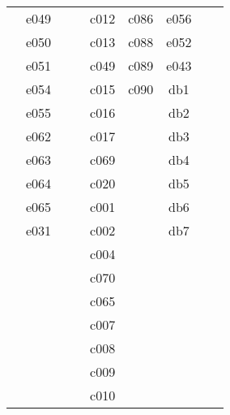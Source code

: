 \documentclass[10pt,letterpaper]{article}
\begin{document}
\begin{center}
\begin{tabular}{ |c|c|c|c|c|c|c|c|c| }
        & e049 &         &         & c012 & c086       & e056 &         &         \\
        & e050 &         &         & c013 & c088       & e052 &         &         \\
        & e051 &         &         & c049 & c089       & e043 &         &         \\
        & e054 &         &         & c015 & c090       & db1  &         &         \\
        & e055 &         &         & c016 &            & db2  &         &         \\
        & e062 &         &         & c017 &            & db3  &         &         \\
        & e063 &         &         & c069 &            & db4  &         &         \\
        & e064 &         &         & c020 &            & db5  &         &         \\
        & e065 &         &         & c001 &            & db6  &         &         \\
        & e031 &         &         & c002 &            & db7  &         &         \\
        &      &         &         & c004 &            &      &         &         \\
        &      &         &         & c070 &            &      &         &         \\
        &      &         &         & c065 &            &      &         &         \\
        &      &         &         & c007 &            &      &         &         \\
        &      &         &         & c008 &            &      &         &         \\
        &      &         &         & c009 &            &      &         &         \\
        &      &         &         & c010 &            &      &         &         \\


        \hline
        \end{tabular}
        \end{center}
\end{document}
